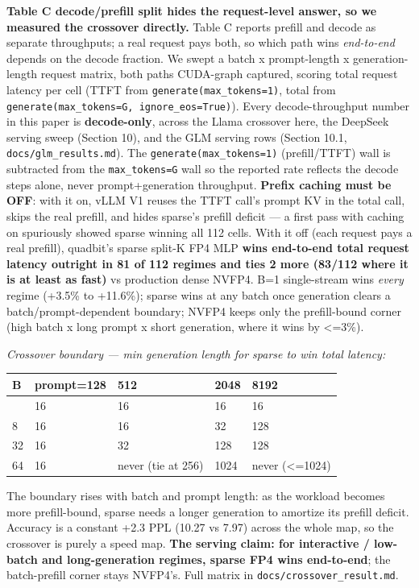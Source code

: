 \documentclass[
]{article}
\begin{document}
\textbf{Table C decode/prefill split hides the request-level answer, so
we measured the crossover directly.} Table C reports prefill and decode
as separate throughputs; a real request pays both, so which path wins
\emph{end-to-end} depends on the decode fraction. We swept a batch x
prompt-length x generation-length request matrix, both paths CUDA-graph
captured, scoring total request latency per cell (TTFT from
\texttt{generate(max\_tokens=1)}, total from
\texttt{generate(max\_tokens=G,\ ignore\_eos=True)}). Every
decode-throughput number in this paper is \textbf{decode-only}, across
the Llama crossover here, the DeepSeek serving sweep (Section 10), and
the GLM serving rows (Section 10.1, \texttt{docs/glm\_results.md}). The
\texttt{generate(max\_tokens=1)} (prefill/TTFT) wall is subtracted from
the \texttt{max\_tokens=G} wall so the reported rate reflects the decode
steps alone, never prompt+generation throughput. \textbf{Prefix caching
must be OFF}: with it on, vLLM V1 reuses the TTFT call's prompt KV in
the total call, skips the real prefill, and hides sparse's prefill
deficit --- a first pass with caching on spuriously showed sparse
winning all 112 cells. With it off (each request pays a real prefill),
quadbit's sparse split-K FP4 MLP \textbf{wins end-to-end total request
latency outright in 81 of 112 regimes and ties 2 more (83/112 where it
is at least as fast)} vs production dense NVFP4. B=1 single-stream wins
\emph{every} regime (+3.5\% to +11.6\%); sparse wins at any batch once
generation clears a batch/prompt-dependent boundary; NVFP4 keeps only
the prefill-bound corner (high batch x long prompt x short generation,
where it wins by \textless=3\%).

\emph{Crossover boundary --- min generation length for sparse to win
total latency:}

\begin{longtable}[]{@{}lllll@{}}
\toprule\noalign{}
B & prompt=128 & 512 & 2048 & 8192 \\
\midrule\noalign{}
\endhead
\bottomrule\noalign{}
\endlastfoot
1 & 16 & 16 & 16 & 16 \\
8 & 16 & 16 & 32 & 128 \\
32 & 16 & 32 & 128 & 128 \\
64 & 16 & never (tie at 256) & 1024 & never (\textless=1024) \\
\end{longtable}

The boundary rises with batch and prompt length: as the workload becomes
more prefill-bound, sparse needs a longer generation to amortize its
prefill deficit. Accuracy is a constant +2.3 PPL (10.27 vs 7.97) across
the whole map, so the crossover is purely a speed map. \textbf{The
serving claim: for interactive / low-batch and long-generation regimes,
sparse FP4 wins end-to-end}; the batch-prefill corner stays NVFP4's.
Full matrix in \texttt{docs/crossover\_result.md}.
\end{document}
